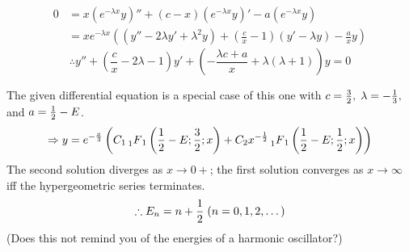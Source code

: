 \item

\begin{align*}
    0
    &= x \left( e^{-\lambda x} y \right)''
     + (c - x) \left( e^{-\lambda x} y \right)'
     - a \left( e^{-\lambda x} y \right) \\
    &= x e^{-\lambda x} \left(
        \left( y'' - 2\lambda y' + \lambda^2 y \right)
        + \left( \frac{c}{x} - 1 \right) \left( y' - \lambda y \right)
        - \frac{a}{x} y
    \right)
\end{align*}
\[
    \therefore y''
    + \left( \frac{c}{x} - 2\lambda - 1 \right) y'
    + \left( -\frac{\lambda c + a}{x} + \lambda (\lambda + 1) \right) y
    = 0
\]

The given differential equation is a special case of this one with
$c = \frac{3}{2},\; \lambda = -\frac{1}{3},$ and $a = \frac{1}{2} - E$.
\[
    \Rightarrow y = e^{-\frac{x}{3}} \left(
        C_1 \prescript{}{1}{F}_{1} \left( \frac{1}{2} - E; \frac{3}{2}; x \right)
        + C_2 x^{-\frac{1}{2}} \prescript{}{1}{F}_{1} \left( \frac{1}{2} -E; \frac{1}{2}; x \right)
    \right)
\]
The second solution diverges as $x \rightarrow 0+$;
the first solution converges as $x \rightarrow \infty$ iff the hypergeometric series terminates.
\[
    \therefore E_n= n + \frac{1}{2}\;
    (n = 0, 1, 2, \dots)
\]
(Does this not remind you of the energies of a harmonic oscillator?)